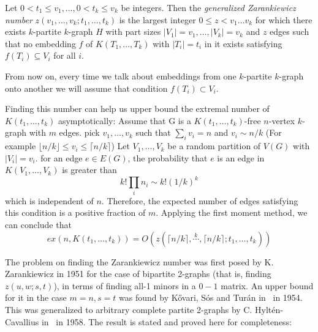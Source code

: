 \begin{definition}\label{def:zarankiewicz}
    Let $0 < t_1 \leq v_1, \dots, 0 < t_k \leq v_k$ be integers.
    Then the \emph{generalized Zarankiewicz number} $z(v_1, \dots, v_k; t_1, \dots, t_k)$
    is the largest integer $0 \leq z < v_1  \dots v_k$ for which there exists $k$-partite $k$-graph
    $H$ with part sizes $ |V_1| = v_1, \dots, |V_k| = v_k$ and $z$ edges
    such that no embedding $f$ of $K(T_1, \dots, T_k)$ with $|T_i| = t_i$ in it exists
    satisfying $f(T_i) \subseteq V_i$ for all $i$.
\end{definition}

From now on, every time we talk about embeddings from one $k$-partite $k$-graph
onto another we will assume that condition $f(T_i) \subset V_i$.

\begin{remark}\label{rem:zar_vs_turan}
    Finding this number can help us upper bound the extremal number of $K(t_1, \dots, t_k)$ asymptotically:
    Assume that G is a $K(t_1, \dots, t_k)$-free $n$-vertex $k$-graph with $m$ edges.
    pick $v_1, \dots, v_k$ such that $\sum_{i} v_i = n $ and $v_i \sim n/k $
    (For example $\lfloor n/k \rfloor \leq v_i \leq \lceil n/k \rceil$)
    Let $V_1, \dots, V_k$ be a random partition of $V(G)$ with $|V_i| = v_i$.
    for an edge $e \in E(G)$, the probability that $e$ is an edge in $K(V_1, \dots, V_k)$ is
    greater than
    \[k! \prod_i n_i \sim k! (1/k)^k\]
    which is independent of $n$.
    Therefore, the expected number of edges satisfying this condition is a positive fraction of $m$.
    Applying the first moment method, we can conclude that
    \[ex(n, K(t_1, \dots, t_k)) = O(z(\lceil n / k \rceil , \overset{k}{\cdots}, \lceil n / k \rceil; t_1, \dots, t_k))\]

\end{remark}


The problem on finding the Zarankiewicz number was first posed by K. Zarankiewicz in 1951 for the
case of bipartite 2-graphs (that is, finding $z(u, w; s, t)$),
in terms of finding all-1 minors in a $0-1$ matrix.
An upper bound for it in the case $m=n, s=t$ was found by Kővari, Sós and Turán in~\cite{Kovari1954} in 1954.
This was generalized to arbitrary complete
partite 2-graphs by C. Hyltén-Cavallius in~\cite{Hylten1958}
in 1958.
The result is stated and proved here for completeness:

